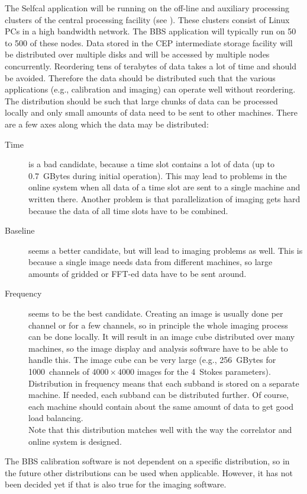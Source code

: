 \documentclass[10pt]{lofar}
\begin{document}
The Selfcal application will be running on the off-line and auxiliary
processing clusters of the central processing facility (see
\cite{LOFAR-ASTRON-ADD-012}). These clusters consist of Linux PCs in a high
bandwidth network. The BBS application will typically run on 50 to 500 of these
nodes. Data stored in the CEP intermediate storage facility will be distributed
over multiple disks and will be accessed by multiple nodes concurrently. 
Reordering tens of terabytes of data takes a lot of time and should be avoided.
Therefore the data should be distributed such that the various applications
(e.g., calibration and imaging) can operate well without reordering. The
distribution should be such that large chunks of data can be
processed locally and only small amounts of data need to be sent to other
machines. There are a few axes along which the data may be distributed:
\begin{description}
\item [Time] is a bad candidate, because a time slot contains a lot of data (up
to 0.7~GBytes during initial operation). This may lead to problems in the
online system when all data of a time slot are sent to a single machine and
written there. Another problem is that parallelization of imaging gets hard
because the data of all time slots have to be combined.
\item [Baseline] seems a better candidate, but will lead to imaging problems as
well. This is because a single image needs data from different machines, so
large amounts of gridded or FFT-ed data have to be sent around.
\item [Frequency] seems to be the best candidate. Creating an image is usually
done per channel or for a few channels, so in principle the whole imaging
process can be done locally. It will result in an image cube distributed over
many machines, so the image display and analysis software have to be able to
handle this. The image cube can be very large (e.g., 256~GBytes for
1000~channels of $4000 \times 4000$ images for the 4~Stokes parameters). \\
Distribution in frequency means that each subband is stored on a separate
machine.  If needed, each subband can be distributed further. Of course, each
machine should contain about the same amount of data to get good load
balancing. \\ 
Note that this distribution matches well with the way the correlator and
online system is designed.
\end{description}
The BBS calibration software is not dependent on a specific distribution, so
in the future other distributions can be used when applicable. However, it has
not been decided yet if that is also true for the imaging software.
\end{document}
